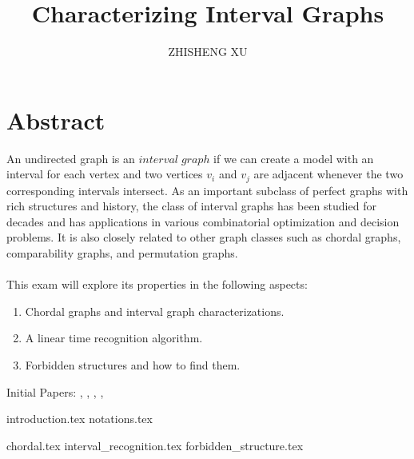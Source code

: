 \documentclass[a4paper,12pt]{article}
\title{Characterizing Interval Graphs}
\author{ZHISHENG XU}
\date{}
\theoremstyle{plain}
\theoremstyle{definition}
\begin{document}
\maketitle


\section{Abstract}
An undirected graph is an $interval\;graph$ if we can create a model with an interval for each vertex
and two vertices $v_i$ and $v_j$ are adjacent whenever the two corresponding intervals intersect.
As an important subclass of perfect graphs with rich structures and history, the class of interval graphs has been studied for decades
and has applications in various combinatorial optimization and decision problems. It is also closely related to other graph classes such as chordal graphs, comparability graphs, and permutation graphs.\paragraph{}
This exam will explore its properties in the following aspects:
\begin{enumerate}
  \item Chordal graphs and interval graph characterizations.
  \item A linear time recognition algorithm.
  \item Forbidden structures and how to find them.
\end{enumerate}

Initial Papers: \cite{rose1976algorithmic}, \cite{lekkerkerker1962representation}, \cite{lindzey2016linear}, \cite{tucker1972structure}, \cite{booth1976testing}
\newpage
\tableofcontents
\newpage





{introduction.tex}
{notations.tex}


{chordal.tex}
{interval_recognition.tex}
{forbidden_structure.tex}








%
\end{document}
